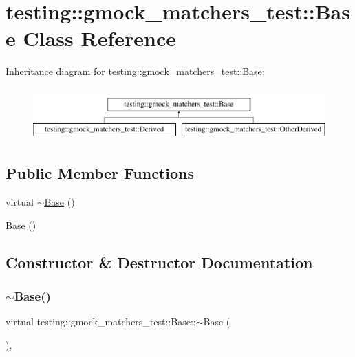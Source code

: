 \hypertarget{classtesting_1_1gmock__matchers__test_1_1Base}{}\section{testing\+::gmock\+\_\+matchers\+\_\+test\+::Base Class Reference}
\label{classtesting_1_1gmock__matchers__test_1_1Base}
Inheritance diagram for testing\+::gmock\+\_\+matchers\+\_\+test\+::Base\+:\begin{figure}[H]
\begin{center}
\leavevmode
\includegraphics[height=2.000000cm]{classtesting_1_1gmock__matchers__test_1_1Base}
\end{center}
\end{figure}
\subsection*{Public Member Functions}
\begin{DoxyCompactItemize}
\item 
virtual \mbox{\hyperlink{classtesting_1_1gmock__matchers__test_1_1Base_ab02c73411d19b28ccb847c65bc782bb6}{$\sim$\+Base}} ()
\item 
\mbox{\hyperlink{classtesting_1_1gmock__matchers__test_1_1Base_ab3b2127992b81455804462897de44516}{Base}} ()
\end{DoxyCompactItemize}


\subsection{Constructor \& Destructor Documentation}
\mbox{\label{classtesting_1_1gmock__matchers__test_1_1Base_ab02c73411d19b28ccb847c65bc782bb6}} 
\subsubsection{\texorpdfstring{$\sim$Base()}{~Base()}}
{\footnotesize\ttfamily virtual testing\+::gmock\+\_\+matchers\+\_\+test\+::\+Base\+::$\sim$\+Base (\begin{DoxyParamCaption}{ }\end{DoxyParamCaption})\hspace{0.3cm}{\ttfamily [inline]}, {\ttfamily [virtual]}}

